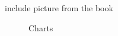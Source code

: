 include picture from the book \begin{figure}[h!]
    \centering
    \caption{Charts}
    \label{fig: charts}
\end{figure}